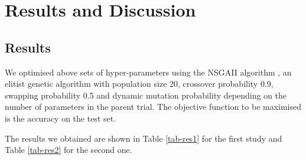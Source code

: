 \documentclass[british,12p]{article}
\begin{document}
    \section{Results and Discussion}
    
    \subsection{Results}
    
    We optimised above sets of hyper-parameters using the NSGAII algorithm \cite{deb:02}, an elitist genetic algorithm with population size 20, crossover probability 0.9, swapping probability 0.5 and dynamic mutation probability depending on the number of parameters in the parent trial. The objective function to be maximised is the accuracy on the test set. 
    
    The results we obtained are shown in Table \ref{tab-res1} for the first study and Table \ref{tab-res2} for the second one.
\end{document}

